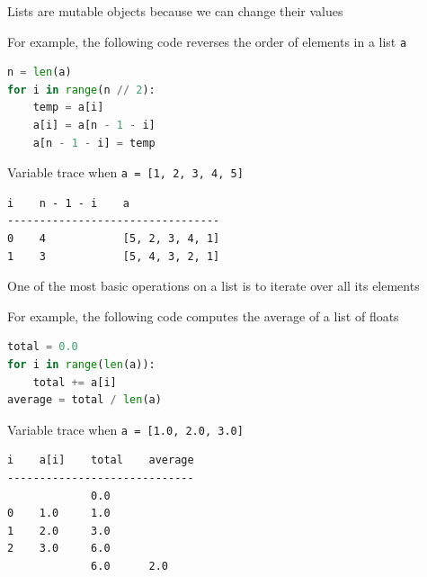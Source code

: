 \documentclass[8pt,a4paper,compress]{beamer}
\begin{document}
\begin{frame}[fragile]
\pause

Lists are mutable objects because we can change their values

\pause
\bigskip

For example, the following code reverses the order of elements in a list \lstinline{a}

\begin{lstlisting}[language=Python]
n = len(a)
for i in range(n // 2):
    temp = a[i]
    a[i] = a[n - 1 - i]
    a[n - 1 - i] = temp
\end{lstlisting}

\pause

Variable trace when \lstinline{a = [1, 2, 3, 4, 5]}
\begin{lstlisting}[language={}]
i    n - 1 - i    a
---------------------------------
0    4            [5, 2, 3, 4, 1]
1    3            [5, 4, 3, 2, 1]
\end{lstlisting} 

\pause
\bigskip

One of the most basic operations on a list is to iterate over all its elements

\pause
\bigskip

For example, the following code computes the average of a list of floats

\begin{lstlisting}[language=Python]
total = 0.0
for i in range(len(a)):
    total += a[i]
average = total / len(a)
\end{lstlisting}

\pause

Variable trace when \lstinline{a = [1.0, 2.0, 3.0]}
\begin{lstlisting}[language={}]
i    a[i]    total    average
-----------------------------
             0.0
0    1.0     1.0
1    2.0     3.0
2    3.0     6.0
             6.0      2.0
\end{lstlisting} 
\end{frame}
\end{document}
